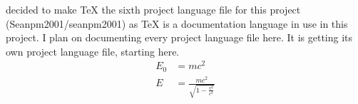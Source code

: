 \documentclass{article} %
\title{\ProjectLanguageFileSix} %
\begin{document}
  \maketitle
  \I decided to make TeX the sixth project language file for this project (Seanpm2001/seanpm2001) as TeX is a documentation language in use in this project. I plan on documenting every project language file here. It is getting its own project language file, starting here.
  \begin{align}
    E_0 &= mc^2 \\
    E &= \frac{mc^2}{\sqrt{1-\frac{v^2}{c^2}}}
  \end{align} 
\end{document}
